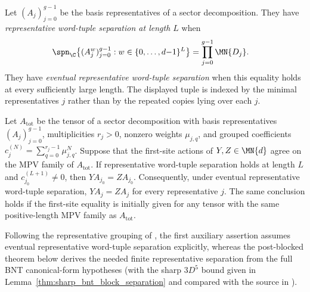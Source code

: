 \begin{definition}
    \label{def:representative_word_tuple_span}
    \leanok
    Let $(A_j)_{j=0}^{g-1}$ be the basis representatives of a sector
    decomposition. They have \emph{representative word-tuple separation at
        length $L$} when
    \begin{align}
        \spn_{\C}\bigl\{(A_j^w)_{j=0}^{g-1}:
        w\in\{0,\ldots,d{-}1\}^{L}\bigr\}
         & =\prod_{j=0}^{g-1}\MN{D_j}.
        \label{eq:mpdo_rep_tuple_sep}
    \end{align}
    They have \emph{eventual representative word-tuple separation} when this
    equality holds at every sufficiently large length. The displayed tuple is
    indexed by the minimal representatives $j$ rather than by the repeated
    copies lying over each $j$.
\end{definition}

\begin{lemma}
    \label{thm:representative_grouped_insert_eq}
    \leanok
    Let $A_{\mathrm{tot}}$ be the tensor of a sector decomposition with basis
    representatives $(A_j)_{j=0}^{g-1}$, multiplicities $r_j>0$, nonzero weights
    $\mu_{j,q}$, and grouped coefficients
    $c_j^{(N)}=\sum_{q=0}^{r_j-1}\mu_{j,q}^{N}$.
    Suppose that the first-site actions of $Y,Z\in\MN{d}$ agree on the MPV
    family of $A_{\mathrm{tot}}$. If representative word-tuple separation
    holds at length $L$ and $c_{j_0}^{(L+1)}\neq0$, then
    $YA_{j_0}=ZA_{j_0}$.
    Consequently, under eventual representative word-tuple separation,
    $YA_j=ZA_j$ for every representative $j$. The same conclusion holds if
    the first-site equality is initially given for any tensor with the same
    positive-length MPV family as $A_{\mathrm{tot}}$.

    Following the representative grouping of
    \cite[Appendix~C.3, lines~1835--1858]{Cirac2016MPDO_arXiv}, the first
    auxiliary assertion assumes eventual representative word-tuple separation
    explicitly, whereas the post-blocked theorem below derives the needed
    finite representative separation from the full BNT canonical-form
    hypotheses (with the sharp $3D^5$ bound given in
    Lemma~\ref{thm:sharp_bnt_block_separation} and compared with the source
    in \cite{gap:cpgsv17_bicf_block_separation}).
\end{lemma}

